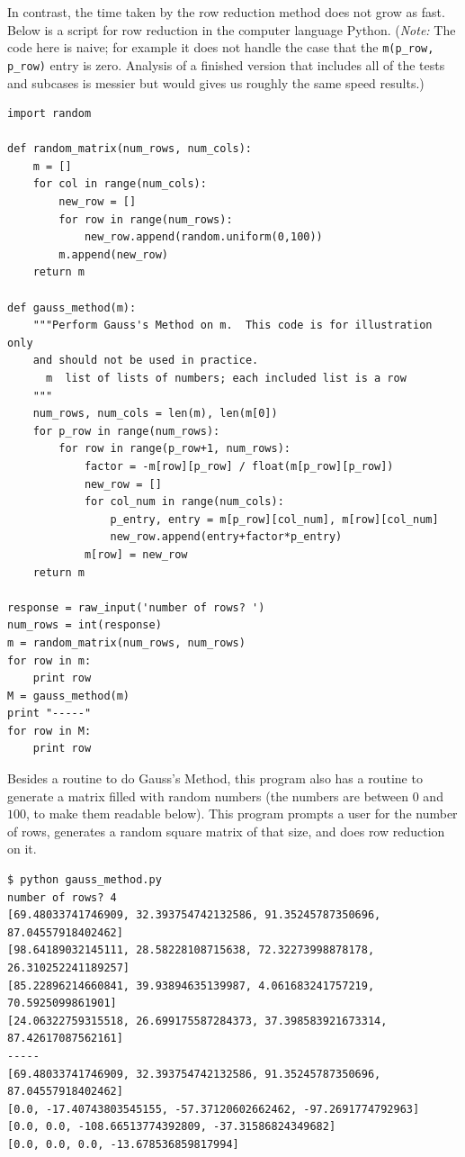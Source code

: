 In contrast, the time taken by the row reduction method does not grow as fast.
Below is a script for row reduction
in the computer language Python.
(\textit{Note:}
The code here is naive; for example it does not handle the case that 
the \lstinline[style=inline]!m(p_row, p_row)! entry is zero.
Analysis of a finished version that includes all of the tests
and subcases is messier but would gives us roughly the same speed
results.)
\begin{lstlisting}
import random

def random_matrix(num_rows, num_cols):
    m = []
    for col in range(num_cols):
        new_row = []
        for row in range(num_rows):
            new_row.append(random.uniform(0,100))
        m.append(new_row)
    return m

def gauss_method(m):
    """Perform Gauss's Method on m.  This code is for illustration only
    and should not be used in practice.
      m  list of lists of numbers; each included list is a row
    """
    num_rows, num_cols = len(m), len(m[0])
    for p_row in range(num_rows):
        for row in range(p_row+1, num_rows):
            factor = -m[row][p_row] / float(m[p_row][p_row])
            new_row = []
            for col_num in range(num_cols): 
                p_entry, entry = m[p_row][col_num], m[row][col_num]
                new_row.append(entry+factor*p_entry)
            m[row] = new_row
    return m

response = raw_input('number of rows? ')
num_rows = int(response)
m = random_matrix(num_rows, num_rows)
for row in m:
    print row
M = gauss_method(m)
print "-----"
for row in M:
    print row
\end{lstlisting}
Besides a routine to do Gauss's Method, this program also has a routine
to generate a matrix filled with random numbers (the numbers are
between $0$ and~$100$, to make them readable below).
This program prompts a user
for the number of rows, generates a random square matrix of
that size, and does row reduction on it.
\begin{lstlisting}
$ python gauss_method.py
number of rows? 4
[69.48033741746909, 32.393754742132586, 91.35245787350696, 87.04557918402462]
[98.64189032145111, 28.58228108715638, 72.32273998878178, 26.310252241189257]
[85.22896214660841, 39.93894635139987, 4.061683241757219, 70.5925099861901]
[24.06322759315518, 26.699175587284373, 37.398583921673314, 87.42617087562161]
-----
[69.48033741746909, 32.393754742132586, 91.35245787350696, 87.04557918402462]
[0.0, -17.40743803545155, -57.37120602662462, -97.2691774792963]
[0.0, 0.0, -108.66513774392809, -37.31586824349682]
[0.0, 0.0, 0.0, -13.678536859817994]
\end{lstlisting}  %

